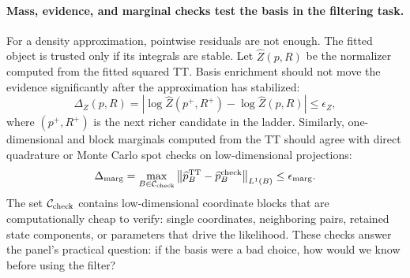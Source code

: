 \documentclass[11pt]{article}
\numberwithin{equation}{section}
\begin{document}
\paragraph{Mass, evidence, and marginal checks test the basis in the
filtering task.}
For a density approximation, pointwise residuals are not enough.  The fitted
object is trusted only if its integrals are stable.  Let
\(\widehat Z(p,R)\) be the normalizer computed from the fitted squared TT.
Basis enrichment should not move the evidence significantly after the
approximation has stabilized:
\begin{equation}
    \Delta_Z(p,R)
    =
    \left|
    \log \widehat Z(p^+,R^+)-\log \widehat Z(p,R)
    \right|
    \le \epsilon_Z,
    \label{eq:p30-basis-evidence-stability}
\end{equation}
where \((p^+,R^+)\) is the next richer candidate in the ladder.  Similarly,
one-dimensional and block marginals computed from the TT should agree with
direct quadrature or Monte Carlo spot checks on low-dimensional projections:
\begin{equation}
    \Delta_{\rm marg}
    =
    \max_{B\in\mathcal C_{\rm check}}
    \left\|
    \widehat p_B^{\rm TT}
    -
    \widehat p_B^{\rm check}
    \right\|_{L^1(B)}
    \le \epsilon_{\rm marg}.
    \label{eq:p30-basis-marginal-check}
\end{equation}
The set \(\mathcal C_{\rm check}\) contains low-dimensional coordinate blocks
that are computationally cheap to verify: single coordinates, neighboring
pairs, retained state components, or parameters that drive the likelihood.
These checks answer the panel's practical question: if the basis were a bad
choice, how would we know before using the filter?
\end{document}

